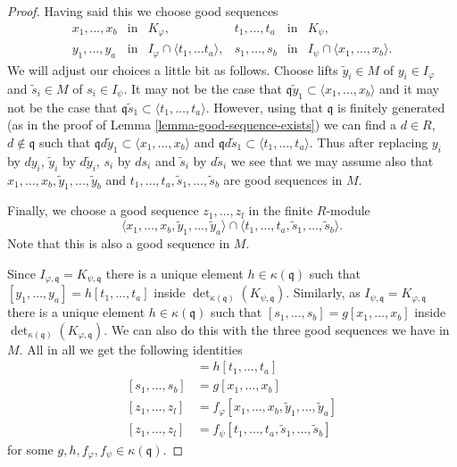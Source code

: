 \begin{proof}
\medskip\noindent
Having said this we choose good sequences
$$
\begin{matrix}
x_1, \ldots, x_b & \text{in} & K_\varphi, &
t_1, \ldots, t_a & \text{in} & K_\psi, \\
y_1, \ldots, y_a & \text{in} & I_\varphi \cap \langle t_1, \ldots t_a\rangle, &
s_1, \ldots, s_b & \text{in} & I_\psi \cap \langle x_1, \ldots, x_b\rangle.
\end{matrix}
$$
We will adjust our choices a little bit as follows.
Choose lifts $\tilde y_i \in M$ of $y_i \in I_\varphi$
and $\tilde s_i \in M$ of $s_i \in I_\psi$. It may not be the case
that $\mathfrak q \tilde y_1 \subset \langle x_1, \ldots, x_b\rangle$
and it may not be the case that
$\mathfrak q \tilde s_1 \subset \langle t_1, \ldots, t_a\rangle$.
However, using that $\mathfrak q$ is finitely generated (as in the proof
of Lemma \ref{lemma-good-sequence-exists}) we can find a
$d \in R$, $d \not \in \mathfrak q$ such that
$\mathfrak q d\tilde y_1 \subset \langle x_1, \ldots, x_b\rangle$
and
$\mathfrak q d\tilde s_1 \subset \langle t_1, \ldots, t_a\rangle$.
Thus after replacing $y_i$ by $dy_i$,
$\tilde y_i$ by $d\tilde y_i$, $s_i$ by $ds_i$ and $\tilde s_i$
by $d\tilde s_i$ we see that we may assume also that
$x_1, \ldots, x_b, \tilde y_1, \ldots, \tilde y_b$
and $t_1, \ldots, t_a, \tilde s_1, \ldots, \tilde s_b$
are good sequences in $M$.

\medskip\noindent
Finally, we choose a good sequence
$z_1, \ldots, z_l$ in the finite $R$-module
$$
\langle
x_1, \ldots, x_b, \tilde y_1, \ldots, \tilde y_a
\rangle
\cap
\langle
t_1, \ldots, t_a, \tilde s_1, \ldots, \tilde s_b
\rangle.
$$
Note that this is also a good sequence in $M$.

\medskip\noindent
Since $I_{\varphi, \mathfrak q} = K_{\psi, \mathfrak q}$
there is a unique element $h \in \kappa(\mathfrak q)$ such that
$[y_1, \ldots, y_a] = h [t_1, \ldots, t_a]$
inside $\det_{\kappa(\mathfrak q)}(K_{\psi, \mathfrak q})$.
Similarly, as $I_{\psi, \mathfrak q} = K_{\varphi, \mathfrak q}$
there is a unique element $h \in \kappa(\mathfrak q)$ such that
$[s_1, \ldots, s_b] = g [x_1, \ldots, x_b]$
inside $\det_{\kappa(\mathfrak q)}(K_{\varphi, \mathfrak q})$.
We can also do this with the three good sequences we have
in $M$. All in all we get the following identities
\begin{align*}
[y_1, \ldots, y_a]
& =
h [t_1, \ldots, t_a] \\
[s_1, \ldots, s_b]
& =
g [x_1, \ldots, x_b] \\
[z_1, \ldots, z_l]
& =
f_\varphi [x_1, \ldots, x_b, \tilde y_1, \ldots, \tilde y_a] \\
[z_1, \ldots, z_l]
& =
f_\psi [t_1, \ldots, t_a, \tilde s_1, \ldots, \tilde s_b]
\end{align*}
for some $g, h, f_\varphi, f_\psi \in \kappa(\mathfrak q)$.


\end{proof}
